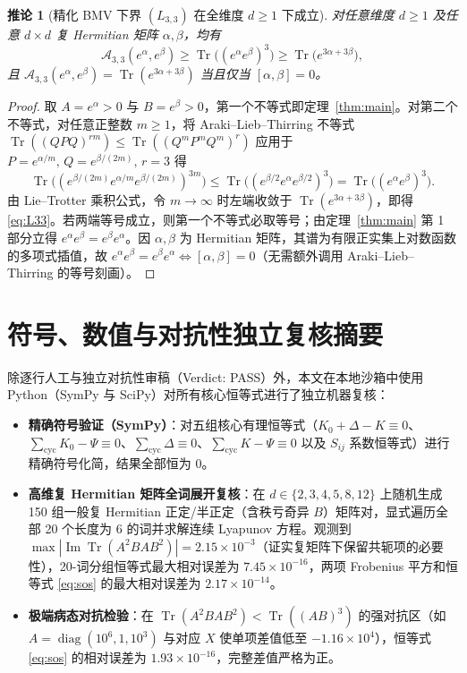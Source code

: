\documentclass[11pt,a4paper]{article}
\newtheorem{corollary}[theorem]{推论}
\theoremstyle{remark}
\newcommand{\Tr}{\operatorname{Tr}}
\begin{document}
\begin{corollary}[精化 BMV 下界 $(L_{3,3})$ 在全维度 $d\ge 1$ 下成立]\label{cor:L33}
对任意维度 $d \ge 1$ 及任意 $d\times d$ 复 Hermitian 矩阵 $\alpha, \beta$，均有
\begin{equation}\label{eq:L33}
  \mathcal{A}_{3,3}(e^\alpha, e^\beta) \ge \Tr\!\big((e^\alpha e^\beta)^3\big) \ge \Tr\!\big(e^{3\alpha + 3\beta}\big),
\end{equation}
且 $\mathcal{A}_{3,3}(e^\alpha, e^\beta) = \Tr(e^{3\alpha+3\beta})$ 当且仅当 $[\alpha, \beta] = 0$。
\end{corollary}

\begin{proof}
取 $A = e^\alpha > 0$ 与 $B = e^\beta > 0$，第一个不等式即定理~\ref{thm:main}。对第二个不等式，对任意正整数 $m \ge 1$，将 Araki--Lieb--Thirring 不等式 $\Tr((Q P Q)^{rm}) \le \Tr((Q^m P^m Q^m)^r)$ 应用于 $P = e^{\alpha/m},\, Q = e^{\beta/(2m)},\, r = 3$ 得
\[
\Tr\!\big((e^{\beta/(2m)} e^{\alpha/m} e^{\beta/(2m)})^{3m}\big) \le \Tr\!\big((e^{\beta/2} e^\alpha e^{\beta/2})^3\big) = \Tr\!\big((e^\alpha e^\beta)^3\big).
\]
由 Lie--Trotter 乘积公式，令 $m \to \infty$ 时左端收敛于 $\Tr(e^{3\alpha + 3\beta})$，即得 \eqref{eq:L33}。若两端等号成立，则第一个不等式必取等号；由定理~\ref{thm:main} 第 1 部分立得 $e^\alpha e^\beta = e^\beta e^\alpha$。因 $\alpha,\beta$ 为 Hermitian 矩阵，其谱为有限正实集上对数函数的多项式插值，故 $e^\alpha e^\beta = e^\beta e^\alpha \iff [\alpha,\beta] = 0$（无需额外调用 Araki--Lieb--Thirring 的等号刻画）。
\end{proof}

\section{符号、数值与对抗性独立复核摘要}

除逐行人工与独立对抗性审稿（Verdict: PASS）外，本文在本地沙箱中使用 Python（SymPy 与 SciPy）对所有核心恒等式进行了独立机器复核：
\begin{itemize}
  \item \textbf{精确符号验证（SymPy）}：对五组核心有理恒等式（$K_0 + \Delta - K \equiv 0$、$\sum_{\mathrm{cyc}} K_0 - \Psi \equiv 0$、$\sum_{\mathrm{cyc}} \Delta \equiv 0$、$\sum_{\mathrm{cyc}} K - \Psi \equiv 0$ 以及 $S_{ij}$ 系数恒等式）进行精确符号化简，结果全部恒为 $0$。
  \item \textbf{高维复 Hermitian 矩阵全词展开复核}：在 $d \in \{2, 3, 4, 5, 8, 12\}$ 上随机生成 150 组一般复 Hermitian 正定/半正定（含秩亏奇异 $B$）矩阵对，显式遍历全部 20 个长度为 6 的词并求解连续 Lyapunov 方程。观测到 $\max |\operatorname{Im}\Tr(A^2BAB^2)| = 2.15 \times 10^{-3}$（证实复矩阵下保留共轭项的必要性），20-词分组恒等式最大相对误差为 $7.45 \times 10^{-16}$，两项 Frobenius 平方和恒等式 \eqref{eq:sos} 的最大相对误差为 $2.17 \times 10^{-14}$。
  \item \textbf{极端病态对抗检验}：在 $\Tr(A^2BAB^2) < \Tr((AB)^3)$ 的强对抗区（如 $A = \operatorname{diag}(10^6, 1, 10^3)$ 与对应 $X$ 使单项差值低至 $-1.16\times 10^4$），恒等式 \eqref{eq:sos} 的相对误差为 $1.93 \times 10^{-16}$，完整差值严格为正。
\end{itemize}
\end{document}
